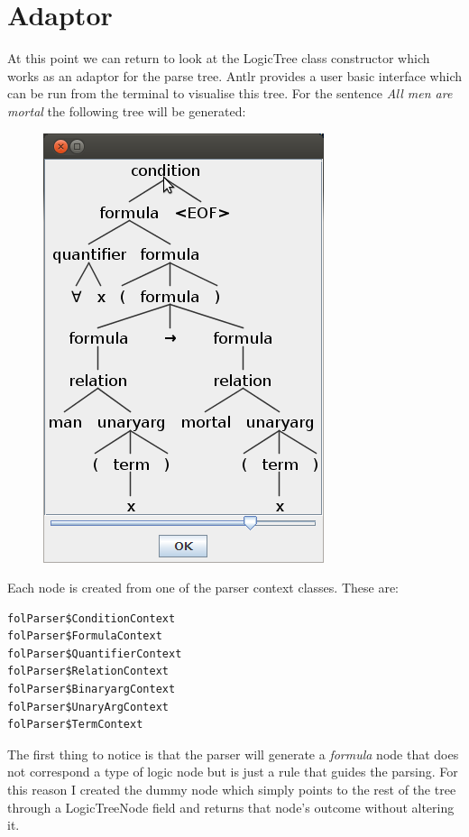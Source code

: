 \documentclass{report}
\begin{document}
\section{Adaptor}
At this point we can return to look at the LogicTree class constructor which 
works as an adaptor for the parse tree. Antlr provides a user basic interface 
which can be run from the terminal to visualise this tree. For the sentence 
\emph{All men are mortal} the following tree will be generated:
\newpage
\begin{figure}[h!]
\centering \includegraphics[scale=0.5]{antlr.png}
\end{figure}
\noindent Each node is created from one of the parser context classes. 
These are: 
\begin{verbatim}
folParser$ConditionContext
folParser$FormulaContext
folParser$QuantifierContext
folParser$RelationContext
folParser$BinaryargContext
folParser$UnaryArgContext
folParser$TermContext
\end{verbatim}
The first thing to notice is that the parser will generate a \emph{formula} node 
that does not correspond a type of logic node but is just a rule that guides the 
parsing. For this reason I created the dummy node which simply points to the 
rest of the tree through a LogicTreeNode field and returns that node's outcome 
without altering it.
\\ \\  
\end{document}
